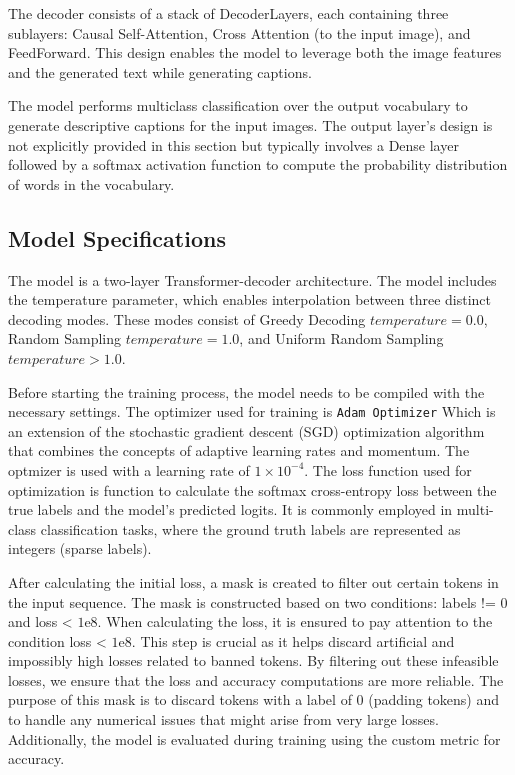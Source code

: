 \documentclass[runningheads]{llncs}
\begin{document}
The decoder consists of a stack of DecoderLayers, each containing three sublayers: Causal Self-Attention, Cross Attention (to the input image), and FeedForward. This design enables the model to leverage both the image features and the generated text while generating captions.

The model performs multiclass classification over the output vocabulary to generate descriptive captions for the input images. The output layer's design is not explicitly provided in this section but typically involves a Dense layer followed by a softmax activation function to compute the probability distribution of words in the vocabulary.

\subsection{Model Specifications}

The model is a two-layer Transformer-decoder architecture. The model includes the temperature parameter, which enables interpolation between three distinct decoding modes. These modes consist of Greedy Decoding $temperature = 0.0$, Random Sampling $temperature = 1.0$, and Uniform Random Sampling $temperature > 1.0$.

Before starting the training process, the model needs to be compiled with the necessary settings. The optimizer used for training is \texttt{Adam Optimizer} Which is an extension of the stochastic gradient descent (SGD) optimization algorithm that combines the concepts of adaptive learning rates and momentum. The optmizer is used with a learning rate of $1 \times 10^{-4}$. The loss function used for optimization is  function to calculate the softmax cross-entropy loss between the true labels and the model's predicted logits. It is commonly employed in multi-class classification tasks, where the ground truth labels are represented as integers (sparse labels).

After calculating the initial loss, a mask is created to filter out certain tokens in the input sequence. The mask is constructed based on two conditions: labels != 0 and loss < $1 \mathrm{e} 8$. When calculating the loss, it is ensured to pay attention to the condition loss < $1 \mathrm{e} 8$. This step is crucial as it helps discard artificial and impossibly high losses related to banned tokens. By filtering out these infeasible losses, we ensure that the loss and accuracy computations are more reliable. The purpose of this mask is to discard tokens with a label of 0 (padding tokens) and to handle any numerical issues that might arise from very large losses. Additionally, the model is evaluated during training using the custom metric for accuracy.
\end{document}
